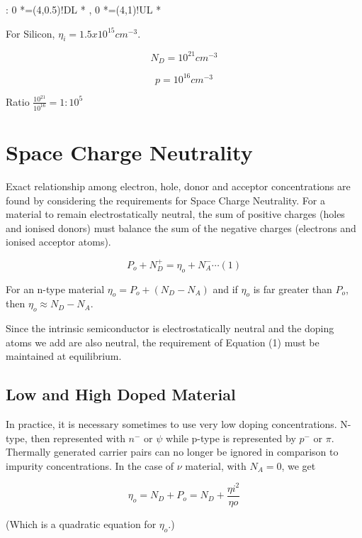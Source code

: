 \documentclass[a4paper,12pt]{article}
\begin{document}
\begin{table}[hbtp]

\xy <1cm,0cm>:
0 *=(4,0.5)!DL *\frm{-} ,
0 *=(4,1)!UL *\frm{-}
\endxy

\caption{For Silicon, $\eta_{i} = 1.5 x 10^{15} cm^{-3}$.}

\end{table}

\[ N_{D} = 10^{21} cm^{-3} \]

\[ p = 10^{16} cm^{-3} \]

Ratio $\frac{10^{21}}{10^{16}} = 1:10^{5}$

\section{Space Charge Neutrality}

Exact relationship among electron, hole, donor and acceptor
concentrations are found by considering the requirements for Space
Charge Neutrality. For a material to remain electrostatically neutral,
the sum of positive charges (holes and ionised donors) must balance the
sum of the negative charges (electrons and ionised acceptor atoms).

\[ P_{o} + N_{D}^{+} = \eta_{o} + N_{A}^{-} \cdots (1) \]

For an n-type material $\eta_{o} = P_{o} + (N_{D} - N_{A})$ and if
$\eta_{o}$ is far greater than $P_{o}$, then $\eta_{o} \approx N_{D} -
N_{A}$.

Since the intrinsic semiconductor is electrostatically neutral
and the doping atoms we add are also neutral, the requirement of
Equation (1) must be maintained at equilibrium.



\subsection{Low and High Doped Material}

In practice, it is necessary sometimes to use very low doping
concentrations. N-type, then represented with $n^{-}$ or $\psi$ while 
p-type is represented by $p^{-}$ or $\pi$. Thermally generated carrier
pairs can no longer be ignored in comparison to impurity concentrations.
In the case of $\nu$ material, with $N_{A} = 0$, we get

\[ \eta_{o} = N_{D} + P_{o} = N_{D} + \frac{\eta{i}^{2}}{\eta{o}} \]

(Which is a quadratic equation for $\eta_{o}$.)
\end{document}
